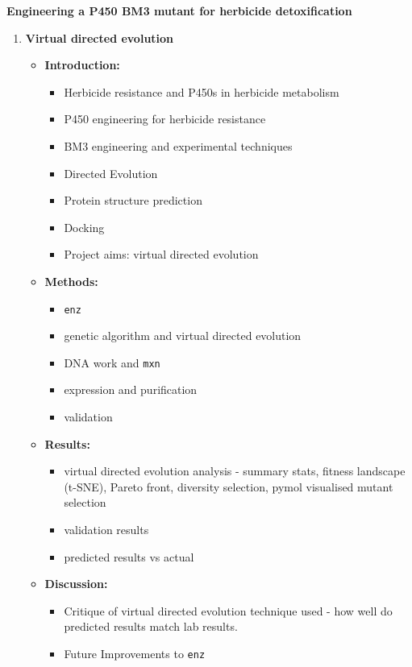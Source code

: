 \documentclass{article}
\begin{document}
{\large\textbf{Engineering a P450 BM3 mutant for herbicide detoxification}}
\\
\begin{enumerate}
	\item \textbf{Virtual directed evolution}
		\begin{itemize}
			\item \textbf{Introduction:} 
				\begin{itemize}
					\item Herbicide resistance and P450s in herbicide metabolism
					\item P450 engineering for herbicide resistance
					\item BM3 engineering and experimental techniques
					\item Directed Evolution 
					\item Protein structure prediction 
					\item Docking 
					\item Project aims: virtual directed evolution
				\end{itemize}
			\item \textbf{Methods:}
				\begin{itemize}
					\item \texttt{enz}
					\item genetic algorithm and virtual directed evolution
					\item DNA work and \texttt{mxn}
					\item expression and purification 
					\item validation
				\end{itemize}
			\item \textbf{Results:}
				\begin{itemize}
					\item virtual directed evolution analysis - summary stats, fitness landscape (t-SNE), Pareto front, diversity selection, pymol visualised mutant selection
					\item validation results
					\item predicted results vs actual
				\end{itemize}
			\item \textbf{Discussion:}
				\begin{itemize}
					\item Critique of virtual directed evolution technique used - how well do predicted results match lab results.
					\item Future Improvements to \texttt{enz}
				\end{itemize}

\end{itemize}
\end{enumerate}
\end{document}
